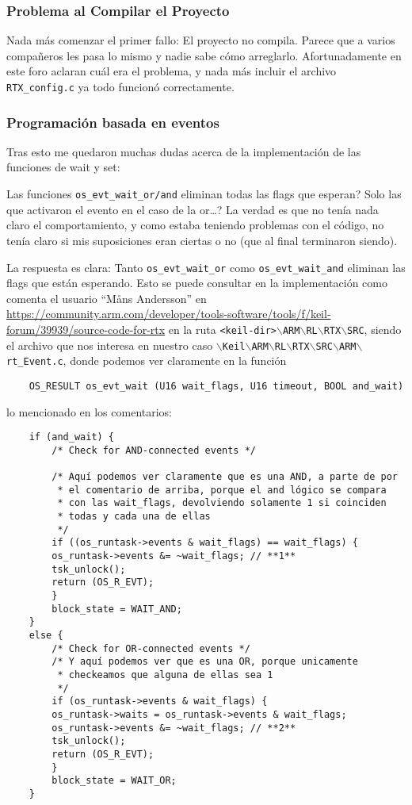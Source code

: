 \documentclass[a4paper,openright,12pt]{article}
\begin{document}
\subsubsection{Problema al Compilar el Proyecto}
Nada más comenzar el primer fallo: El proyecto no compila. Parece que a varios compañeros les pasa lo mismo y nadie sabe cómo arreglarlo. Afortunadamente en este foro
\parencite{solucionar_rtx_undefined_symbol} aclaran cuál era el problema, y nada más incluir el archivo \texttt{RTX\_config.c} ya todo funcionó correctamente.

\subsubsection{Programación basada en eventos}
Tras esto me quedaron muchas dudas acerca de la implementación de las funciones de wait y set:

Las funciones \texttt{os\_evt\_wait\_or/and} eliminan todas las flags que esperan? Solo las que activaron el evento en el caso de la or\ldots? La verdad es que no tenía nada
claro el comportamiento, y como estaba teniendo problemas con el código, no tenía claro si mis suposiciones eran ciertas o no (que al final terminaron siendo).

La respuesta es clara: Tanto \texttt{os\_evt\_wait\_or} como \texttt{os\_evt\_wait\_and} eliminan las flags que están esperando. Esto se puede consultar en la implementación como comenta
el usuario ``Måns Andersson'' en \url{https://community.arm.com/developer/tools-software/tools/f/keil-forum/39939/source-code-for-rtx} en la ruta
\texttt{<keil-dir>$\backslash$ARM$\backslash$RL$\backslash$RTX$\backslash$SRC},
siendo el archivo que nos interesa en nuestro caso \texttt{$\backslash$Keil$\backslash$ARM$\backslash$RL$\backslash$RTX$\backslash$SRC$\backslash$ARM$\backslash$rt\_Event.c}, donde podemos
ver claramente en la función
\begin{verbatim}
    OS_RESULT os_evt_wait (U16 wait_flags, U16 timeout, BOOL and_wait)    
\end{verbatim}
lo mencionado en los comentarios:
\begin{verbatim}
    if (and_wait) {
        /* Check for AND-connected events */

        /* Aquí podemos ver claramente que es una AND, a parte de por
         * el comentario de arriba, porque el and lógico se compara
         * con las wait_flags, devolviendo solamente 1 si coinciden
         * todas y cada una de ellas
         */
        if ((os_runtask->events & wait_flags) == wait_flags) {
        os_runtask->events &= ~wait_flags; // **1**
        tsk_unlock();
        return (OS_R_EVT);
        }
        block_state = WAIT_AND;
    }
    else {
        /* Check for OR-connected events */
        /* Y aquí podemos ver que es una OR, porque unicamente
         * checkeamos que alguna de ellas sea 1
         */
        if (os_runtask->events & wait_flags) {
        os_runtask->waits = os_runtask->events & wait_flags;
        os_runtask->events &= ~wait_flags; // **2**
        tsk_unlock();
        return (OS_R_EVT);
        }
        block_state = WAIT_OR;
    }
\end{verbatim}
\end{document}

